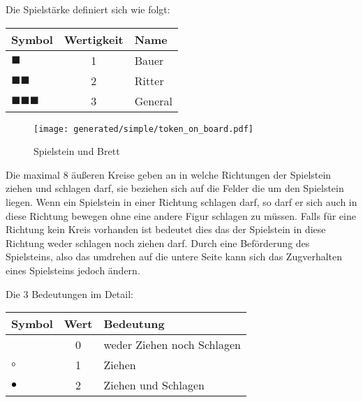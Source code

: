 \documentclass{article}
\begin{document}
	\begin{flushleft}
	Die Spielstärke definiert sich wie folgt:	
	
	\begin{tabular}{lcl}
	\hline
	Symbol & Wertigkeit & Name \\ \hline 
	$\blacksquare$ & 1 & Bauer \\ 
	$\blacksquare\blacksquare$ & 2 & Ritter \\ 
	$\blacksquare\blacksquare\blacksquare$ & 3 & General \\ 
	\end{tabular}
	\end{flushleft}
	
	
	
	
	\begin{wrapfigure}{r}{6.2cm}
  	\texttt{[image: generated/simple/token\_on\_board.pdf]}
  	\caption{Spielstein und Brett}
	\end{wrapfigure}
	
	Die maximal 8 äußeren Kreise geben an in welche Richtungen der Spielstein ziehen und 
	schlagen darf, sie beziehen sich auf die Felder die um den Spielstein liegen.
	Wenn ein Spielstein in einer Richtung schlagen darf, so darf er sich auch in 
	diese Richtung bewegen ohne eine andere Figur schlagen zu müssen. Falls für eine
	Richtung kein Kreis vorhanden ist bedeutet dies das der Spielstein in diese Richtung
	weder schlagen noch ziehen darf. Durch eine Beförderung des Spielsteins, also das umdrehen
	auf die untere Seite kann sich das Zugverhalten eines Spielsteins jedoch ändern.
	
	
	\vspace{0.2cm}
	
	\begin{flushleft}
	Die 3 Bedeutungen im Detail: 
	\end{flushleft}
	
	\vspace{0.2cm}
	
	\begin{tabular}{lcl}
	\hline
	Symbol & Wert & Bedeutung  \\  \hline
									& 0 & weder Ziehen noch Schlagen \\
	\textcolor{black}{$\circ$}		& 1 & Ziehen \\ 
	\textcolor{black}{$\bullet$} 	& 2 & Ziehen und Schlagen  \\ 
	\end{tabular}
	 
	\vspace{0.3cm}
    
\end{document}
